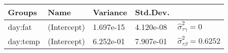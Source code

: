 \documentclass[12pt,]{article}
\begin{document}
\begin{longtable}[]{@{}lllll@{}}
\toprule
\begin{minipage}[b]{0.10\columnwidth}\raggedright
Groups\strut
\end{minipage} & \begin{minipage}[b]{0.13\columnwidth}\raggedright
Name\strut
\end{minipage} & \begin{minipage}[b]{0.11\columnwidth}\raggedright
Variance\strut
\end{minipage} & \begin{minipage}[b]{0.11\columnwidth}\raggedright
Std.Dev.\strut
\end{minipage} & \begin{minipage}[b]{0.40\columnwidth}\raggedright
\strut
\end{minipage}\tabularnewline
\midrule
\endhead
\begin{minipage}[t]{0.10\columnwidth}\raggedright
day:fat\strut
\end{minipage} & \begin{minipage}[t]{0.13\columnwidth}\raggedright
(Intercept)\strut
\end{minipage} & \begin{minipage}[t]{0.11\columnwidth}\raggedright
1.697e-15\strut
\end{minipage} & \begin{minipage}[t]{0.11\columnwidth}\raggedright
4.120e-08\strut
\end{minipage} & \begin{minipage}[t]{0.40\columnwidth}\raggedright
\(\hat\sigma^2_{\tau\gamma}=0\)\strut
\end{minipage}\tabularnewline
\begin{minipage}[t]{0.10\columnwidth}\raggedright
day:temp\strut
\end{minipage} & \begin{minipage}[t]{0.13\columnwidth}\raggedright
(Intercept)\strut
\end{minipage} & \begin{minipage}[t]{0.11\columnwidth}\raggedright
6.252e-01\strut
\end{minipage} & \begin{minipage}[t]{0.11\columnwidth}\raggedright
7.907e-01\strut
\end{minipage} & \begin{minipage}[t]{0.40\columnwidth}\raggedright
\(\hat\sigma^2_{\tau\beta}=0.6252\)\strut
\end{minipage}\tabularnewline

\end{longtable}
\end{document}
